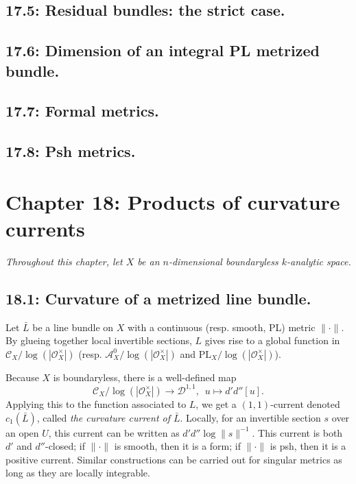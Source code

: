 \documentclass[12pt,reqno]{amsart}
\theoremstyle{definition}
\theoremstyle{remark}
\theoremstyle{citedrem}
\theoremstyle{cited}
\theoremstyle{citeddef}
\theoremstyle{step}
\begin{document}
\subsection*{17.5: Residual bundles: the strict case. }

\subsection*{17.6: Dimension of an integral PL metrized bundle. }

\subsection*{17.7: Formal metrics. }

\subsection*{17.8: Psh metrics. }

\section*{Chapter 18: Products of curvature currents}
\begin{center}
    \emph{Throughout  this chapter, let $X$ be an $n$-dimensional boundaryless $k$-analytic space.}
\end{center}
\subsection*{18.1: Curvature of a metrized line bundle. }Let $\bar{L}$ be a line bundle on $X$ with a continuous (resp. smooth, PL) metric $\| \cdot \|$. By glueing together local invertible sections, $L$ gives rise to a global function in $\mathcal{C}_X / \log(|\mathcal{O}_X^\times|)$ (resp. $\mathcal{A}_X^0 / \log(|\mathcal{O}_X^\times|)$ and $\mathrm{PL}_X / \log(|\mathcal{O}_X^\times|)$). 

Because $X$ is boundaryless, there is a well-defined map \[\mathcal{C}_X / \log(|\mathcal{O}_X^\times|) \to \mathcal{D}^{1,1}, \,\,\,u \mapsto d'd''[u].\] Applying this to the function associated to $L$, we get a $(1,1)$-current denoted $c_1(\bar{L})$, called \emph{the curvature current of $\bar{L}$}. Locally, for an invertible section $s$ over an open $U$, this current can be written as $d'd''\log\|s\|^{-1}$. This current is both $d'$ and $d''$-closed; if $\|\cdot\|$ is smooth, then it is a form; if $\| \cdot \|$ is psh, then it is a positive current. Similar constructions can be carried out for singular metrics as long as they are locally integrable. 
\end{document}
